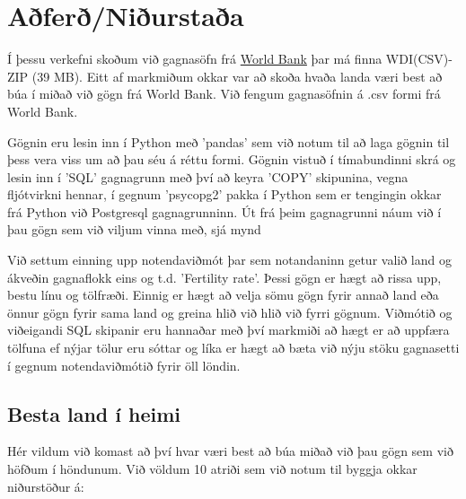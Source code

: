\documentclass[paper=a4, fontsize=11pt]{scrartcl}
\begin{document}


\section{Aðferð/Niðurstaða}
Í þessu verkefni skoðum við gagnasöfn frá \href{http://data.worldbank.org/data-catalog/world-development-indicators}{World Bank} þar má finna WDI(CSV)-ZIP (39 MB). Eitt af markmiðum okkar var að skoða hvaða landa væri best að búa í miðað við gögn frá World Bank. Við fengum gagnasöfnin á .csv formi frá World Bank.\par Gögnin eru lesin inn í Python með 'pandas' sem við notum til að laga gögnin til þess vera viss um að þau séu á réttu formi. Gögnin vistuð í tímabundinni skrá og lesin inn í 'SQL' gagnagrunn með því að keyra 'COPY' skipunina, vegna fljótvirkni hennar, í gegnum 'psycopg2' pakka í Python sem er tengingin okkar frá Python við Postgresql gagnagrunninn. Út frá þeim gagnagrunni náum við í þau gögn sem við viljum vinna með, sjá mynd %
\par Við settum einning upp notendaviðmót þar sem notandaninn getur valið land og ákveðin gagnaflokk eins og t.d. 'Fertility rate'. Þessi gögn er hægt að rissa upp, bestu línu og tölfræði. Einnig er hægt að velja sömu gögn fyrir annað land eða önnur gögn fyrir sama land og greina hlið við hlið við fyrri gögnum. Viðmótið og viðeigandi SQL skipanir eru hannaðar með því markmiði að hægt er að uppfæra tölfuna ef nýjar tölur eru sóttar og líka er hægt að bæta við nýju stöku gagnasetti í gegnum notendaviðmótið fyrir öll löndin.


\subsection{Besta land í heimi}
Hér vildum við komast að því hvar væri best að búa miðað við þau gögn sem við höfðum í höndunum. Við völdum 10 atriði sem við notum til byggja okkar niðurstöður á:\\
\noindent
\end{document}
